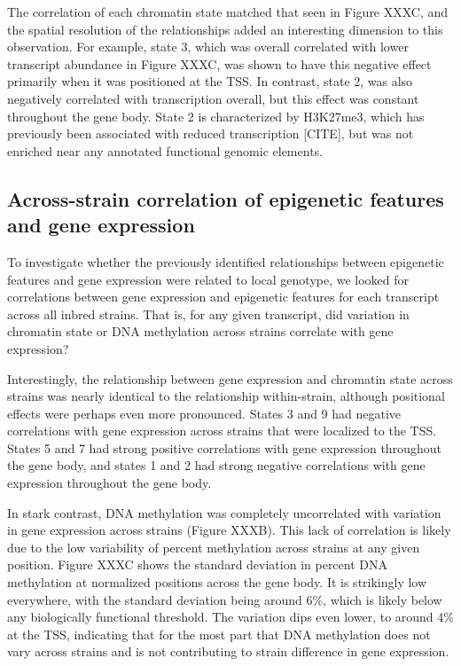 \documentclass[10pt,letterpaper]{article}
\begin{document}
The correlation of each chromatin state matched that seen in Figure
XXXC, and the spatial resolution of the relationships added an
interesting dimension to this observation. For example, state 3, which
was overall correlated with lower transcript abundance in Figure XXXC,
was shown to have this negative effect primarily when it was positioned
at the TSS. In contrast, state 2, was also negatively correlated with
transcription overall, but this effect was constant throughout the gene
body. State 2 is characterized by H3K27me3, which has previously been
associated with reduced transcription {[}CITE{]}, but was not enriched
near any annotated functional genomic elements.

\hypertarget{across-strain-correlation-of-epigenetic-features-and-gene-expression}{%
\subsection{Across-strain correlation of epigenetic features and gene
expression}\label{across-strain-correlation-of-epigenetic-features-and-gene-expression}}

To investigate whether the previously identified relationships between
epigenetic features and gene expression were related to local genotype,
we looked for correlations between gene expression and epigenetic
features for each transcript across all inbred strains. That is, for any
given transcript, did variation in chromatin state or DNA methylation
across strains correlate with gene expression?

Interestingly, the relationship between gene expression and chromatin
state across strains was nearly identical to the relationship
within-strain, although positional effects were perhaps even more
pronounced. States 3 and 9 had negative correlations with gene
expression across strains that were localized to the TSS. States 5 and 7
had strong positive correlations with gene expression throughout the
gene body, and states 1 and 2 had strong negative correlations with gene
expression throughout the gene body.

In stark contrast, DNA methylation was completely uncorrelated with
variation in gene expression across strains (Figure XXXB). This lack of
correlation is likely due to the low variability of percent methylation
across strains at any given position. Figure XXXC shows the standard
deviation in percent DNA methylation at normalized positions across the
gene body. It is strikingly low everywhere, with the standard deviation
being around 6\%, which is likely below any biologically functional
threshold. The variation dips even lower, to around 4\% at the TSS,
indicating that for the most part that DNA methylation does not vary
across strains and is not contributing to strain difference in gene
expression.
\end{document}

